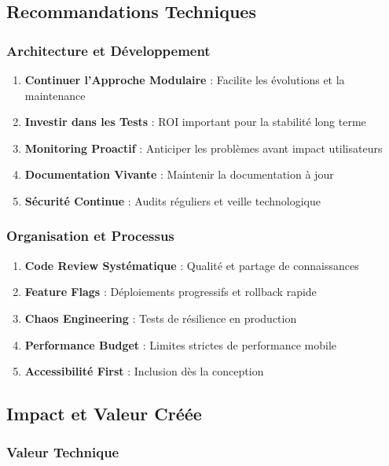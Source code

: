 \subsection{Recommandations Techniques}

\subsubsection{Architecture et Développement}

\begin{enumerate}
    \item \textbf{Continuer l'Approche Modulaire} : Facilite les évolutions et la maintenance
    \item \textbf{Investir dans les Tests} : ROI important pour la stabilité long terme
    \item \textbf{Monitoring Proactif} : Anticiper les problèmes avant impact utilisateurs
    \item \textbf{Documentation Vivante} : Maintenir la documentation à jour
    \item \textbf{Sécurité Continue} : Audits réguliers et veille technologique
\end{enumerate}

\subsubsection{Organisation et Processus}

\begin{enumerate}
    \item \textbf{Code Review Systématique} : Qualité et partage de connaissances
    \item \textbf{Feature Flags} : Déploiements progressifs et rollback rapide
    \item \textbf{Chaos Engineering} : Tests de résilience en production
    \item \textbf{Performance Budget} : Limites strictes de performance mobile
    \item \textbf{Accessibilité First} : Inclusion dès la conception
\end{enumerate}

\subsection{Impact et Valeur Créée}

\subsubsection{Valeur Technique}

